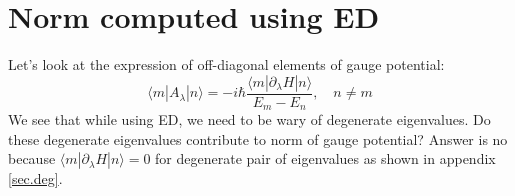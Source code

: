 \documentclass[11pt,a4paper]{article}
\begin{document}
\section{Norm computed using ED}

Let's look at the expression of off-diagonal elements of gauge potential:
\begin{equation}
\langle m |A_{\lambda} | n \rangle =  -i \hbar \dfrac{\langle m |\partial_{\lambda}H | n \rangle}{E_m-E_n}, \quad n \neq m
\end{equation}
We see that while using ED, we need to be wary of degenerate eigenvalues. Do these degenerate eigenvalues contribute to norm of gauge potential? Answer is no because $\langle m |\partial_{\lambda}H | n \rangle=0$ for degenerate pair of eigenvalues as shown in appendix \ref{sec.deg}.




%
\end{document}
